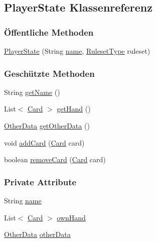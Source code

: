 \hypertarget{a00065}{\subsection{Player\-State Klassenreferenz}
\label{a00065}
}
\subsubsection*{Öffentliche Methoden}
\begin{DoxyCompactItemize}
\item 
\hyperlink{a00065_ae5e23cf6597e1623372eed77011eb1dd}{Player\-State} (String \hyperlink{a00065_a9a2326f35466e54c36c070829245c557}{name}, \hyperlink{a00066}{Ruleset\-Type} ruleset)
\end{DoxyCompactItemize}
\subsubsection*{Geschützte Methoden}
\begin{DoxyCompactItemize}
\item 
String \hyperlink{a00065_a78ee178b6a73658d65ca60da4d1e6683}{get\-Name} ()
\item 
List$<$ \hyperlink{a00054}{Card} $>$ \hyperlink{a00065_aac8743f95e5333eecd44953b98497c50}{get\-Hand} ()
\item 
\hyperlink{a00064}{Other\-Data} \hyperlink{a00065_a82343e519ce2834ec3213417fbcceab7}{get\-Other\-Data} ()
\item 
void \hyperlink{a00065_a9d6772b6ea3db9cedcf14fcbfcaf5cec}{add\-Card} (\hyperlink{a00054}{Card} card)
\item 
boolean \hyperlink{a00065_a2b5a3aa440e294908184d114f70c96f4}{remove\-Card} (\hyperlink{a00054}{Card} card)
\end{DoxyCompactItemize}
\subsubsection*{Private Attribute}
\begin{DoxyCompactItemize}
\item 
\hypertarget{a00065_a9a2326f35466e54c36c070829245c557}{String \hyperlink{a00065_a9a2326f35466e54c36c070829245c557}{name}}\label{a00065_a9a2326f35466e54c36c070829245c557}

\item 
\hypertarget{a00065_aea826404229e1bee34c99850a2f737e4}{List$<$ \hyperlink{a00054}{Card} $>$ \hyperlink{a00065_aea826404229e1bee34c99850a2f737e4}{own\-Hand}}\label{a00065_aea826404229e1bee34c99850a2f737e4}

\item 
\hypertarget{a00065_a3afe0e4fb96897b91f3d032b385af1d7}{\hyperlink{a00064}{Other\-Data} \hyperlink{a00065_a3afe0e4fb96897b91f3d032b385af1d7}{other\-Data}}\label{a00065_a3afe0e4fb96897b91f3d032b385af1d7}

\end{DoxyCompactItemize}


